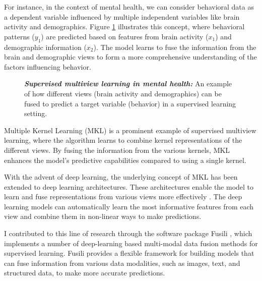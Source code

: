 For instance, in the context of mental health, we can consider behavioral data as a dependent variable influenced by multiple independent variables like brain activity and demographics. Figure \ref{fig:mentalhealthsupervised} illustrates this concept, where behavioral patterns ($y_1$) are predicted based on features from brain activity ($x_1$) and demographic information ($x_2$). The model learns to fuse the information from the brain and demographic \gls{views} to form a more comprehensive understanding of the factors influencing behavior.

\begin{figure}
    \centering
        \caption[Supervised multiview learning in mental health]{\textit{\textbf{Supervised multiview learning in mental health:}} An example of how different \gls{views} (brain activity and demographics) can be fused to predict a target variable (behavior) in a supervised learning setting.}\label{fig:mentalhealthsupervised}
\end{figure}

Multiple Kernel Learning (MKL) \citep{gonen2011multiple} is a prominent example of supervised multiview learning, where the algorithm learns to combine kernel \gls{representations} of the different views. By fusing the information from the various kernels, MKL enhances the model's predictive capabilities compared to using a single kernel.

With the advent of deep learning, the underlying concept of MKL has been extended to deep learning architectures. These architectures enable the model to learn and fuse \gls{representations} from various \gls{views} more effectively \citep{guo2019deep}. The deep learning models can automatically learn the most informative features from each view and combine them in non-linear ways to make predictions.

I contributed to this line of research through the software package Fusili \citep{florence_townend_2023_10228564}, which implements a number of deep-learning based multi-modal data fusion methods for supervised learning. Fusili provides a flexible framework for building models that can fuse information from various data modalities, such as images, text, and structured data, to make more accurate predictions.

